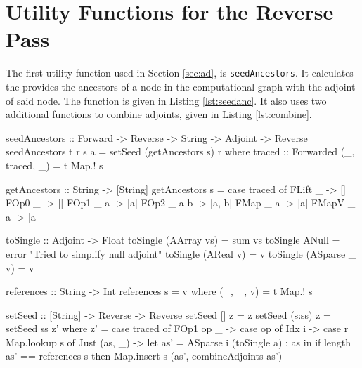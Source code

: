 \section{Utility Functions for the Reverse Pass} \label{app:utility}
    The first utility function used in Section \ref{sec:ad}, is \texttt{seedAncestors}.
    It calculates the provides the ancestors of a node in the computational graph with the adjoint of said node.
    The function is given in Listing \ref{lst:seedanc}.
    It also uses two additional functions to combine adjoints, given in Listing \ref{lst:combine}.

    \begin{haskell}[caption=Function for seeding ancestors of a node, label=lst:seedanc, gobble=8]
        seedAncestors :: Forward -> Reverse -> String -> Adjoint -> Reverse
        seedAncestors t r s a = setSeed (getAncestors s) r
            where
                traced :: Forwarded
                (_, traced, _) = t Map.! s
                
                getAncestors :: String -> [String]
                getAncestors s = case traced of
                    FLift _     -> []
                    FOp0  _     -> []
                    FOp1  _ a   -> [a]
                    FOp2  _ a b -> [a, b]
                    FMap  _ a   -> [a]
                    FMapV _ a   -> [a]
                
                toSingle :: Adjoint -> Float
                toSingle (AArray vs)   = sum vs
                toSingle ANull         = error "Tried to simplify null adjoint"
                toSingle (AReal v)     = v
                toSingle (ASparse _ v) = v

                references :: String -> Int
                references s = v
                    where (_, _, v) = t Map.! s

                setSeed :: [String] -> Reverse -> Reverse
                setSeed []     z = z
                setSeed (s:ss) z = setSeed ss z'
                    where z' = case traced of
                        FOp1 op _ -> case op of
                            Idx i -> case r Map.lookup s of
                                Just (as, _) ->
                                    let as' = ASparse i (toSingle a) : as
                                    in  if   length as' == references s
                                        then Map.insert s (as', combineAdjoints as')
    \end{haskell}


